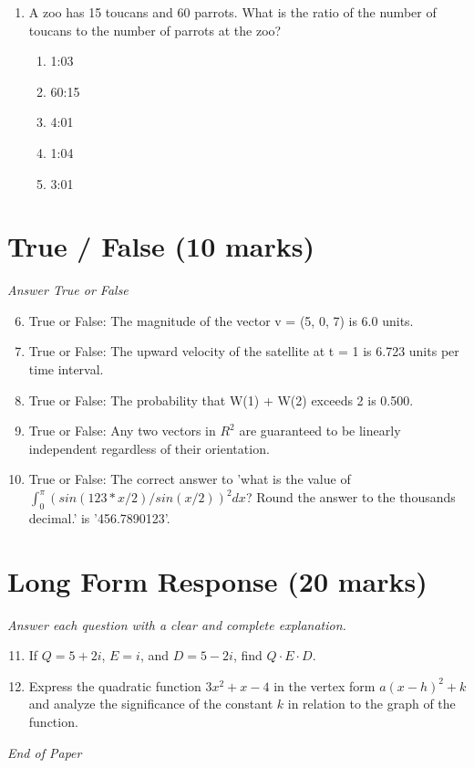 \documentclass[12pt]{article}
\begin{document}
\begin{enumerate}[label=\arabic*.]
\begin{enumerate}[label=(\alph*)]
    \item 2200
    \item 1800
    \item 2041
    \item 2100
    \item 1700
\end{enumerate}
\item A zoo has 15 toucans and 60 parrots. What is the ratio of the number of toucans to the number of parrots at the zoo?
\begin{enumerate}[label=(\alph*)]
    \item 1:03
    \item 60:15
    \item 4:01
    \item 1:04
    \item 3:01
\end{enumerate}
\end{enumerate}

\section*{True / False (10 marks)}
\textit{Answer True or False}
\begin{enumerate}[label=\arabic*.]
\setcounter{enumi}{5}
\item True or False: The magnitude of the vector v = (5, 0, 7) is 6.0 units.
\item True or False: The upward velocity of the satellite at t = 1 is 6.723 units per time interval.
\item True or False: The probability that W(1) + W(2) exceeds 2 is 0.500.
\item True or False: Any two vectors in $R^2$ are guaranteed to be linearly independent regardless of their orientation.
\item True or False: The correct answer to 'what is the value of $\int_{0}^\pi (sin(123*x/2)/sin(x/2))^2 dx$? Round the answer to the thousands decimal.' is '456.7890123'.
\end{enumerate}

\section*{Long Form Response (20 marks)}
\textit{Answer each question with a clear and complete explanation.}
\begin{enumerate}[label=\arabic*.]
\setcounter{enumi}{10}
\item If $Q = 5+2 i$, $E = i$, and $D = 5-2 i$, find $Q\cdot E \cdot D$.
\item Express the quadratic function \(3 x^2 + x - 4\) in the vertex form \(a(x - h)^2 + k\) and analyze the significance of the constant \(k\) in relation to the graph of the function.
\end{enumerate}

\vfill
\noindent\textit{End of Paper}
\end{document}
